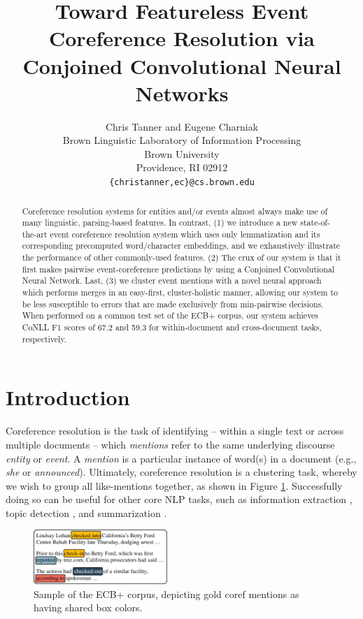 \documentclass[11pt,a4paper]{article}
\title{Toward Featureless Event Coreference Resolution via Conjoined Convolutional Neural Networks}
\author{Chris Tanner \textnormal{and} Eugene Charniak\\
Brown Linguistic Laboratory of Information Processing \\
  Brown University \\
  Providence, RI  02912 \\
  {\tt \{christanner,ec\}@cs.brown.edu} \\}
\date{}
\begin{document}
\maketitle
\begin{abstract}
Coreference resolution systems for entities and/or events almost always make use of many linguistic, parsing-based features.  In contrast, (1) we introduce a new state-of-the-art event coreference resolution system which uses only lemmatization and its corresponding precomputed word/character embeddings, and we exhaustively illustrate the performance of other commonly-used features.  (2) The crux of our system is that it first makes pairwise event-coreference predictions by using a Conjoined Convolutional Neural Network.  Last, (3) we cluster event mentions with a novel neural approach which performs merges in an easy-first, cluster-holistic manner, allowing our system to be less susceptible to errors that are made exclusively from min-pairwise decisions.  When performed on a common test set of the ECB+ corpus, our system achieves CoNLL F1 scores of 67.2 and 59.3 for within-document and cross-document tasks, respectively.
\end{abstract}


\section{Introduction}
Coreference resolution is the task of identifying -- within a single text or across multiple documents -- which \textit{mentions} refer to the same underlying discourse \textit{entity} or \textit{event}.  A \textit{mention} is a particular instance of word(s) in a document (e.g., \textit{she} or \textit{announced}).  Ultimately, coreference resolution is a clustering task, whereby we wish to group all like-mentions together, as shown in Figure \ref{fig:corpus}.  Successfully doing so can be useful for other core NLP tasks, such as information extraction \cite{Humphreys:1997}, topic detection \cite{Allan:1998}, and summarization \cite{Daniel:2003}.

\begin{figure}[ht]
\centering
	\includegraphics[width=0.45\textwidth]{corpus}
	\caption{Sample of the ECB+ corpus, depicting gold coref mentions as having shared box colors.}
	\label{fig:corpus}
\end{figure}
\end{document}
